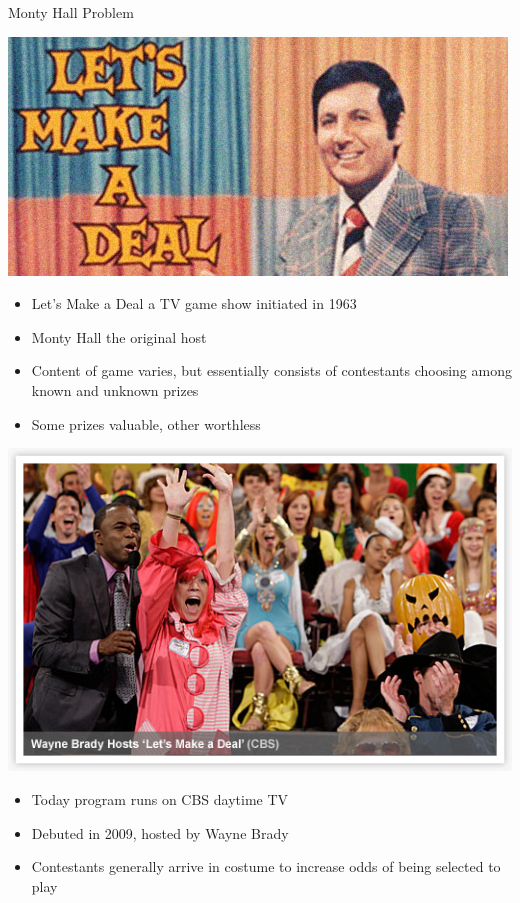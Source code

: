 \documentclass[handout]{beamer}
\theoremstyle{definition}
\begin{document}
\begin{frame}{Monty Hall Problem}
\begin{center}\includegraphics[scale=.5]{LetsMakeDeal}\end{center}
\begin{itemize}
\item \alert{Let's Make a Deal} a TV game show
initiated in 1963
\item Monty Hall the original host
\item Content of game varies, but essentially
consists of contestants choosing among known and unknown prizes
\item Some prizes valuable, other worthless
\end{itemize}
\end{frame}

\begin{frame}
\begin{center}\includegraphics[scale=.5]{WayneBrady}\end{center}
\begin{itemize}
\item Today program runs on CBS daytime TV
\item Debuted in 2009, hosted by Wayne Brady
\item Contestants generally arrive in costume
to increase odds of being selected to play
\end{itemize}
\end{frame}
\end{document}

